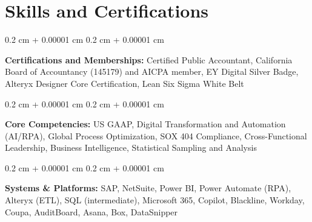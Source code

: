 \documentclass[10pt, letterpaper]{article}
\newenvironment{onecolentry}{
    \begin{adjustwidth}{
        0.2 cm + 0.00001 cm
    }{
        0.2 cm + 0.00001 cm
    }
}{
    \end{adjustwidth}
} %
\begin{document}
    
    \section{Skills and Certifications}

        \begin{onecolentry}
            \textbf{Certifications and Memberships:} Certified Public Accountant, California Board of Accountancy (145179) and AICPA member, EY Digital Silver Badge, Alteryx Designer Core Certification, Lean Six Sigma White Belt
        \end{onecolentry}




        \vspace{0.2 cm}

        \begin{onecolentry}
            \textbf{Core Competencies:} US GAAP, Digital Transformation and Automation (AI/RPA), Global Process Optimization, SOX 404 Compliance, Cross-Functional Leadership, Business Intelligence, Statistical Sampling and Analysis
        \end{onecolentry}

        \vspace{0.2 cm}

        \begin{onecolentry}
            \textbf{Systems \& Platforms:} SAP, NetSuite, Power BI, Power Automate (RPA), Alteryx (ETL), SQL (intermediate), Microsoft 365, Copilot, Blackline, Workday, Coupa, AuditBoard, Asana, Box, DataSnipper
        \end{onecolentry}
\end{document}
